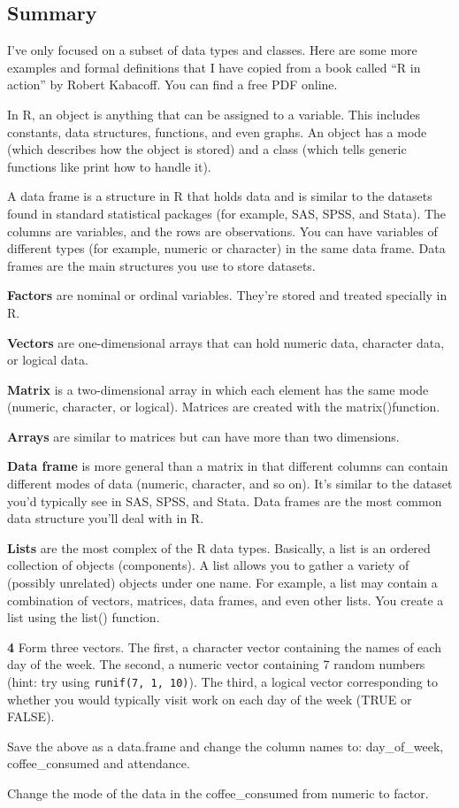 \documentclass[
]{book}
\makeatletter
\newenvironment{kframe}{%
\medskip{}
\setlength{\fboxsep}{.8em}
 \def\at@end@of@kframe{}%
 \ifinner\ifhmode%
  \def\at@end@of@kframe{\end{minipage}}%
  \begin{minipage}{\columnwidth}%
 \fi\fi%
 \def\FrameCommand##1{\hskip\@totalleftmargin \hskip-\fboxsep
 \colorbox{shadecolor}{##1}\hskip-\fboxsep
     \hskip-\linewidth \hskip-\@totalleftmargin \hskip\columnwidth}%
 \MakeFramed {\advance\hsize-\width
   \@totalleftmargin\z@ \linewidth\hsize
   \@setminipage}}%
 {\par\unskip\endMakeFramed%
 \at@end@of@kframe}
\newenvironment{rmdblock}[1]
  {
  \begin{itemize}
  \renewcommand{\labelitemi}{
    \raisebox{-.7\height}[0pt][0pt]{
      {\setkeys{Gin}{width=3em,keepaspectratio}\texttt{[image: images/\#1]}}
    }
  }
  \setlength{\fboxsep}{1em}
  \begin{kframe}
  \item
  }
  {
  \end{kframe}
  \end{itemize}
  }
\newenvironment{rmdquiz}
  {\begin{rmdblock}{quiz}}
  {\end{rmdblock}}
\makeatother
\begin{document}
\hypertarget{summary}{%
\subsection{Summary}\label{summary}}

I've only focused on a subset of data types and classes. Here are some more examples and formal definitions that I have copied from a book called ``R in action'' by Robert Kabacoff. You can find a free PDF online.

In R, an object is anything that can be assigned to a variable. This includes constants, data structures, functions, and even graphs. An object has a mode (which describes how the object is stored) and a class (which tells generic functions like print how to handle it).

A data frame is a structure in R that holds data and is similar to the datasets found in standard statistical packages (for example, SAS, SPSS, and Stata). The columns are variables, and the rows are observations. You can have variables of different types (for example, numeric or character) in the same data frame. Data frames are the main structures you use to store datasets.

\textbf{Factors} are nominal or ordinal variables. They're stored and treated specially in R.

\textbf{Vectors} are one-dimensional arrays that can hold numeric data, character data, or logical data.

\textbf{Matrix} is a two-dimensional array in which each element has the same mode
(numeric, character, or logical). Matrices are created with the matrix()function.

\textbf{Arrays} are similar to matrices but can have more than two dimensions.

\textbf{Data frame} is more general than a matrix in that different columns can contain different modes of data (numeric, character, and so on). It's similar to the dataset you'd typically see in SAS, SPSS, and Stata. Data frames are the most common data structure you'll deal with in R.

\textbf{Lists} are the most complex of the R data types. Basically, a list is an ordered collection of objects (components). A list allows you to gather a variety of (possibly unrelated) objects under one name. For example, a list may contain a combination of vectors, matrices, data frames, and even other lists. You create a list using the list() function.

\begin{rmdquiz}
\textbf{4} Form three vectors. The first, a character vector containing the names of each day of the week. The second, a numeric vector containing 7 random numbers (hint: try using \texttt{runif(7,\ 1,\ 10)}). The third, a logical vector corresponding to whether you would typically visit work on each day of the week (TRUE or FALSE).

Save the above as a data.frame and change the column names to: day\_of\_week, coffee\_consumed and attendance.

Change the mode of the data in the coffee\_consumed from numeric to factor.\\
\end{rmdquiz}
\end{document}
